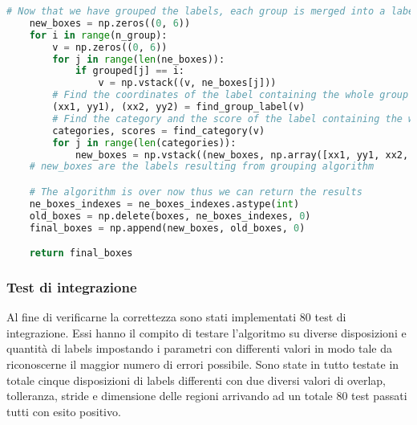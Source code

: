 \begin{lstlisting}[language=Python, caption=Python example]
    # Now that we have grouped the labels, each group is merged into a label containing all of them
    new_boxes = np.zeros((0, 6))
    for i in range(n_group):
        v = np.zeros((0, 6))
        for j in range(len(ne_boxes)):
            if grouped[j] == i:
                v = np.vstack((v, ne_boxes[j]))
        # Find the coordinates of the label containing the whole group
        (xx1, yy1), (xx2, yy2) = find_group_label(v)
        # Find the category and the score of the label containing the whole group
        categories, scores = find_category(v)
        for j in range(len(categories)):
            new_boxes = np.vstack((new_boxes, np.array([xx1, yy1, xx2, yy2, categories[j], scores[j]])))
    # new_boxes are the labels resulting from grouping algorithm

    # The algorithm is over now thus we can return the results
    ne_boxes_indexes = ne_boxes_indexes.astype(int)
    old_boxes = np.delete(boxes, ne_boxes_indexes, 0)
    final_boxes = np.append(new_boxes, old_boxes, 0)

    return final_boxes
\end{lstlisting}
\subsubsection{Test di integrazione}
Al fine di verificarne la correttezza sono stati implementati 80 test di integrazione. Essi hanno il compito di testare l'algoritmo su diverse disposizioni e quantità di labels impostando i parametri con differenti valori in modo tale da riconoscerne il maggior numero di errori possibile. Sono state in tutto testate in totale cinque disposizioni di labels differenti con due diversi valori di overlap, tolleranza, stride e dimensione delle regioni arrivando ad un totale 80 test passati tutti con esito positivo.


